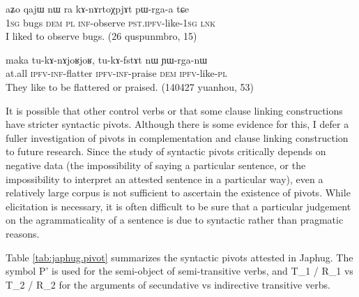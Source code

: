 \documentclass[oldfontcommands,oneside,a4paper,11pt]{article}
\newcommand{\ipa}[1]{{\phon #1}} %
\begin{document}
   \begin{exe}
   \ex   \label{ex:kAnArtoXpjAt.pWrgaa} 
\gll
  	\ipa{aʑo}  	\ipa{qajɯ}  	\ipa{nɯ} \ipa{ra}  	\ipa{kɤ-nɤrtoχpjɤt}  	\ipa{pɯ-rga-a}  	\ipa{tɕe}  	\\
  	\textsc{1sg} bugs \textsc{dem} \textsc{pl} \textsc{inf}-observe \textsc{pst.ipfv}-like-\textsc{1sg} \textsc{lnk}  \\
 \glt I liked to observe bugs. (26 quspunmbro, 15)
     \end{exe}  
 
  \begin{exe}
   \ex   \label{ex:YWrganW} 
\gll
\ipa{maka}  	\ipa{tu-kɤ-nɤjoʁjoʁ,}  	\ipa{tu-kɤ-fstɤt}  	\ipa{nɯ}  	\ipa{ɲɯ-rga-nɯ}  \\
at.all \textsc{ipfv-inf}-flatter \textsc{ipfv-inf}-praise \textsc{dem} \textsc{ipfv}-like-\textsc{pl} \\
\glt They like to be flattered or praised. (140427 yuanhou, 53)
    \end{exe}  
 

It is possible that other control verbs or that some clause linking constructions have  stricter syntactic pivots. Although there is some evidence for this, I defer a fuller investigation of pivots in complementation and clause linking construction to future research. Since the study of syntactic pivots critically depends on negative data (the impossibility of saying a particular sentence, or the impossibility to interpret an attested sentence in a particular way), even a relatively large corpus is not sufficient to ascertain the existence of pivots. While elicitation is necessary, it is often difficult to be sure that a particular judgement on the agrammaticality of a sentence is due to syntactic rather than pragmatic reasons. 
 
Table \ref{tab:japhug.pivot} summarizes the syntactic pivots  attested in Japhug. The symbol P' is used for the semi-object of semi-transitive verbs, and T_1 / R_1 vs T_2 / R_2 for the arguments of secundative vs indirective transitive verbs.
\end{document}
